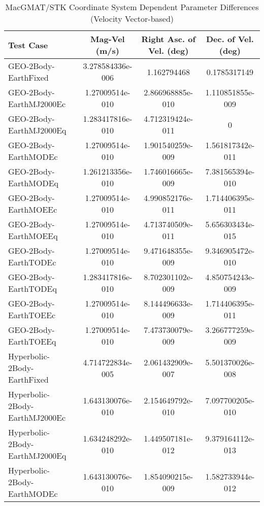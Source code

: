 \begin{table}[htbp!]
\centering
\caption{ MacGMAT/STK Coordinate System Dependent Parameter Differences (Velocity Vector-based)}
      \begin{tabular}{lccc}
      \hline\hline
          Test Case & Mag-Vel (m/s) & Right Asc. of Vel. (deg) & Dec. of Vel. (deg) \\
         \hline
         GEO-2Body-EarthFixed & 3.278584336e-006 & 1.162794468 & 0.1785317149 \\
         GEO-2Body-EarthMJ2000Ec & 1.27009514e-010 & 2.866968885e-010 & 1.110851855e-009 \\
         GEO-2Body-EarthMJ2000Eq & 1.283417816e-010 & 4.712319424e-011 & 0 \\
         GEO-2Body-EarthMODEc & 1.27009514e-010 & 1.901540259e-009 & 1.561817342e-011 \\
         GEO-2Body-EarthMODEq & 1.261213356e-010 & 1.746016665e-009 & 7.381565394e-010 \\
         GEO-2Body-EarthMOEEc & 1.27009514e-010 & 4.990852176e-011 & 1.714406395e-011 \\
         GEO-2Body-EarthMOEEq & 1.27009514e-010 & 4.713740509e-011 & 5.656303434e-015 \\
         GEO-2Body-EarthTODEc & 1.27009514e-010 & 9.471648355e-009 & 9.346905472e-010 \\
         GEO-2Body-EarthTODEq & 1.283417816e-010 & 8.702301102e-009 & 4.850754243e-009 \\
         GEO-2Body-EarthTOEEc & 1.27009514e-010 & 8.144496633e-009 & 1.714406395e-011 \\
         GEO-2Body-EarthTOEEq & 1.27009514e-010 & 7.473730079e-009 & 3.266777259e-009 \\
         Hyperbolic-2Body-EarthFixed & 4.714722834e-005 & 2.061432909e-007 & 5.501370026e-008 \\
         Hyperbolic-2Body-EarthMJ2000Ec & 1.643130076e-010 & 2.154649792e-010 & 7.097700205e-010 \\
         Hyperbolic-2Body-EarthMJ2000Eq & 1.634248292e-010 & 1.449507181e-012 & 9.379164112e-013 \\
         Hyperbolic-2Body-EarthMODEc & 1.643130076e-010 & 1.854090215e-009 & 1.582733944e-012 \\

\end{tabular}
\end{table}
